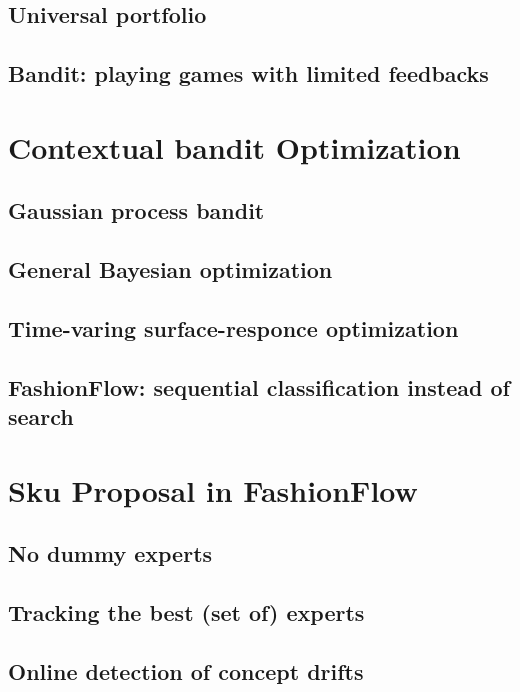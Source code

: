 \documentclass{beamer}
\begin{document}
\subsection{Universal portfolio}
\subsection{Bandit: playing games with limited feedbacks}


\section{Contextual bandit Optimization}
\subsection{Gaussian process bandit}
\subsection{General Bayesian optimization} 
\subsection{Time-varing surface-responce optimization}
\subsection{FashionFlow: sequential classification instead of search}


\section{Sku Proposal in FashionFlow}
\subsection{No dummy experts}
\subsection{Tracking the best (set of) experts}
\subsection{Online detection of concept drifts}

\end{document}
